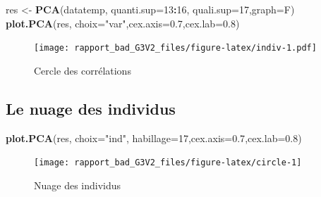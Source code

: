 \documentclass[
]{article}
\newenvironment{Shaded}{\begin{snugshade}}{\end{snugshade}}
\newcommand{\DataTypeTok}[1]{\textcolor[rgb]{0.13,0.29,0.53}{#1}}
\newcommand{\DecValTok}[1]{\textcolor[rgb]{0.00,0.00,0.81}{#1}}
\newcommand{\FloatTok}[1]{\textcolor[rgb]{0.00,0.00,0.81}{#1}}
\newcommand{\KeywordTok}[1]{\textcolor[rgb]{0.13,0.29,0.53}{\textbf{#1}}}
\newcommand{\NormalTok}[1]{#1}
\newcommand{\OperatorTok}[1]{\textcolor[rgb]{0.81,0.36,0.00}{\textbf{#1}}}
\newcommand{\StringTok}[1]{\textcolor[rgb]{0.31,0.60,0.02}{#1}}
\begin{document}
\begin{Shaded}
\begin{Highlighting}[]
\NormalTok{res <-}\StringTok{ }\KeywordTok{PCA}\NormalTok{(datatemp, }\DataTypeTok{quanti.sup=}\DecValTok{13}\OperatorTok{:}\DecValTok{16}\NormalTok{, }\DataTypeTok{quali.sup=}\DecValTok{17}\NormalTok{,}\DataTypeTok{graph=}\NormalTok{F)}
\KeywordTok{plot.PCA}\NormalTok{(res, }\DataTypeTok{choix=}\StringTok{"var"}\NormalTok{,}\DataTypeTok{cex.axis=}\FloatTok{0.7}\NormalTok{,}\DataTypeTok{cex.lab=}\FloatTok{0.8}\NormalTok{)}
\end{Highlighting}
\end{Shaded}

\begin{figure}
\centering
\texttt{[image: rapport\_bad\_G3V2\_files/figure-latex/indiv-1.pdf]}
\caption{Cercle des corrélations}
\end{figure}

\hypertarget{le-nuage-des-individus}{%
\subsection{\texorpdfstring{\textbf{Le nuage des
individus}}{Le nuage des individus}}\label{le-nuage-des-individus}}

\begin{Shaded}
\begin{Highlighting}[]
\KeywordTok{plot.PCA}\NormalTok{(res, }\DataTypeTok{choix=}\StringTok{"ind"}\NormalTok{, }\DataTypeTok{habillage=}\DecValTok{17}\NormalTok{,}\DataTypeTok{cex.axis=}\FloatTok{0.7}\NormalTok{,}\DataTypeTok{cex.lab=}\FloatTok{0.8}\NormalTok{)}
\end{Highlighting}
\end{Shaded}

\begin{figure}[h]

{\centering \texttt{[image: rapport\_bad\_G3V2\_files/figure-latex/circle-1]} 

}

\caption{Nuage des individus}\label{fig:circle}
\end{figure}
\end{document}
